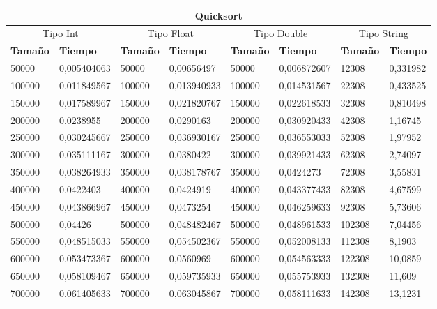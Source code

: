 \documentclass[11pt]{article}
\begin{document}
\begin{table}[!ht]
    \centering
    \small
    \begin{tabular}{|l|l|l|l|l|l|l|l|}
    \hline
    \multicolumn{8}{|c|}{\cellcolor{blue!20}\textbf{Quicksort}} \\ \hline
    \multicolumn{2}{|c|}{\cellcolor{gray!20}Tipo Int} & \multicolumn{2}{c|}{\cellcolor{gray!20}Tipo Float} & \multicolumn{2}{c|}{\cellcolor{gray!20}Tipo Double} & \multicolumn{2}{c|}{\cellcolor{gray!20}Tipo String}\\ \hline
        \textbf{Tamaño} & \textbf{Tiempo} & \textbf{Tamaño} & \textbf{Tiempo} & \textbf{Tamaño} & \textbf{Tiempo} & \textbf{Tamaño} & \textbf{Tiempo} \\ \hline
        50000 & 0,005404063 & 50000 & 0,00656497 & 50000 & 0,006872607 & 12308 & 0,331982 \\ \hline
        100000 & 0,011849567 & 100000 & 0,013940933 & 100000 & 0,014531567 & 22308 & 0,433525 \\ \hline
        150000 & 0,017589967 & 150000 & 0,021820767 & 150000 & 0,022618533 & 32308 & 0,810498 \\ \hline
        200000 & 0,0238955 & 200000 & 0,0290163 & 200000 & 0,030920433 & 42308 & 1,16745 \\ \hline
        250000 & 0,030245667 & 250000 & 0,036930167 & 250000 & 0,036553033 & 52308 & 1,97952 \\ \hline
        300000 & 0,035111167 & 300000 & 0,0380422 & 300000 & 0,039921433 & 62308 & 2,74097 \\ \hline
        350000 & 0,038264933 & 350000 & 0,038178767 & 350000 & 0,0424273 & 72308 & 3,55831 \\ \hline
        400000 & 0,0422403 & 400000 & 0,0424919 & 400000 & 0,043377433 & 82308 & 4,67599 \\ \hline
        450000 & 0,043866967 & 450000 & 0,0473254 & 450000 & 0,046259633 & 92308 & 5,73606 \\ \hline
        500000 & 0,04426 & 500000 & 0,048482467 & 500000 & 0,048961533 & 102308 & 7,04456 \\ \hline
        550000 & 0,048515033 & 550000 & 0,054502367 & 550000 & 0,052008133 & 112308 & 8,1903 \\ \hline
        600000 & 0,053473367 & 600000 & 0,0560969 & 600000 & 0,054563333 & 122308 & 10,0859 \\ \hline
        650000 & 0,058109467 & 650000 & 0,059735933 & 650000 & 0,055753933 & 132308 & 11,609 \\ \hline
        700000 & 0,061405633 & 700000 & 0,063045867 & 700000 & 0,058111633 & 142308 & 13,1231 \\ \hline

\end{tabular}
\end{table}
\end{document}
